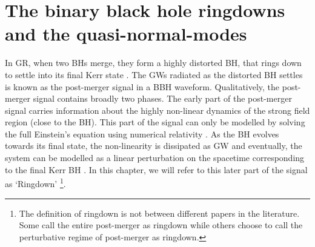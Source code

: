 \newcommand{\fni}{\mathscr{I^+}}
\newcommand{\Msun}{\ensuremath{\mathrm{M}_\odot}}

\section{The binary black hole ringdowns and the quasi-normal-modes}


In GR, when two BHs merge, they form a highly distorted BH, that rings down to settle into its final Kerr state \cite{Teukolsky:2014vca, 2014PhRvD..89b4031D}. The GWs radiated as the distorted BH settles is known as the post-merger signal in a BBH waveform. Qualitatively, the post-merger signal contains broadly two phases. The early part of the post-merger signal carries information about the highly non-linear dynamics of the strong field region (close to the BH). This part of the signal can only be modelled by solving the full Einstein's equation using numerical relativity \cite{BH-GW-NR}. As the BH evolves towards its final state, the non-linearity is dissipated as GW and eventually, the system can be modelled as a linear perturbation on the spacetime corresponding to the final Kerr BH \cite{Teukolsky1,Teukolsky2,Teukolsky3}. In this chapter, we will refer to this later part of the signal as `Ringdown' \footnote{The definition of ringdown is not between different papers in the literature.  Some call the entire post-merger as ringdown while others choose to call the perturbative regime of post-merger as ringdown. }.


